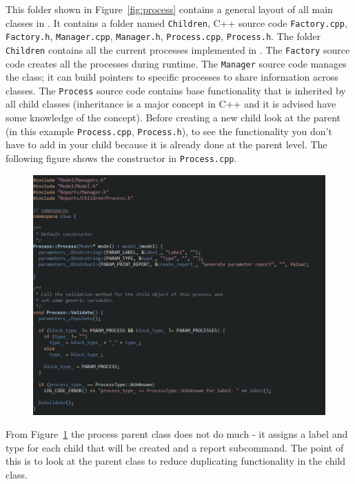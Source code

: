 This folder shown in Figure~\ref{fig:process} contains a general layout of all main classes in \CNAME. It contains a folder named \texttt{Children}, C++ source code \texttt{Factory.cpp}, \texttt{Factory.h}, \texttt{Manager.cpp}, \texttt{Manager.h}, \texttt{Process.cpp}, \texttt{Process.h}. The folder \texttt{Children} contains all the current processes implemented in \CNAME. The \texttt{Factory} source code creates all the processes during runtime. The \texttt{Manager} source code manages the class; it can build pointers to specific processes to share information across classes. The \texttt{Process} source code contains base functionality that is inherited by all child classes (inheritance is a major concept in C++ and it is  advised have some knowledge of the concept). Before creating a new child look at the parent (in this example \texttt{Process.cpp}, \texttt{Process.h}), to see the functionality you don't have to add in your child because it is already done at the parent level. The following figure shows the constructor in \texttt{Process.cpp}.
\clearpage
\begin{figure}[!ht]
	\centering
	\includegraphics[scale=0.6]{Figures/add_survival1.png}
	\caption{}\label{fig:process1}
\end{figure}

From Figure~\ref{fig:process1} the process parent class does not do much {\color{red}-} it assigns a label and type for each child that will be created and a report subcommand. The point of this is to look at the parent class to reduce duplicating functionality in the child class.


